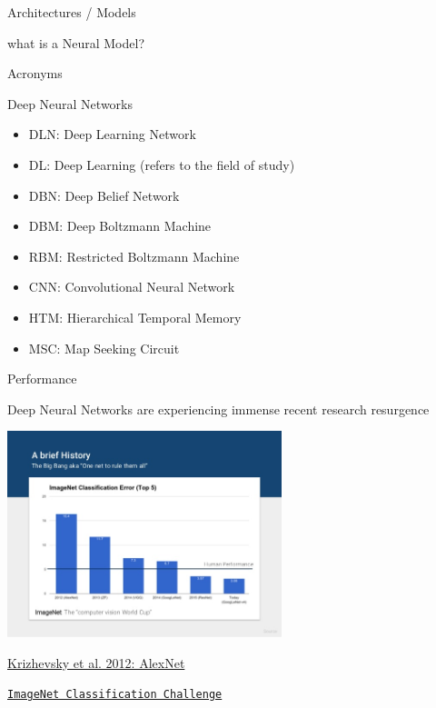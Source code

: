 \documentclass[12pt,t]{beamer}
\begin{document}
\begin{frame}[c]{Architectures / Models}

\pause

what is a Neural Model?
\pause

\end{frame}

\begin{frame}{Acronyms}

Deep Neural Networks \pause

\begin{itemize}

\item DLN: Deep Learning Network \pause
\item DL: Deep Learning (refers to the field of study) \pause
\item DBN: Deep Belief Network \pause
\item DBM: Deep Boltzmann Machine \pause
\item RBM: Restricted Boltzmann Machine \pause
\item CNN: Convolutional Neural Network \pause
\item HTM: Hierarchical Temporal Memory \pause
\item MSC: Map Seeking Circuit \pause

\end{itemize}

\end{frame}

\begin{frame}[c]{Performance}

\pause

Deep Neural Networks are experiencing immense recent research resurgence
\pause

\includegraphics[height=60mm]{Figs/performance_imagenet_years.jpg}
\pause

\href{http://papers.nips.cc/paper/4824-imagenet-classification-with-deep-convolutional-neural-networks.pdf}{Krizhevsky et al. 2012: AlexNet}
\pause

\hfill
{\footnotesize \lolit
\href{http://www.image-net.org/challenges/LSVRC}{\tt ImageNet Classification Challenge}
}

\end{frame}
\end{document}
